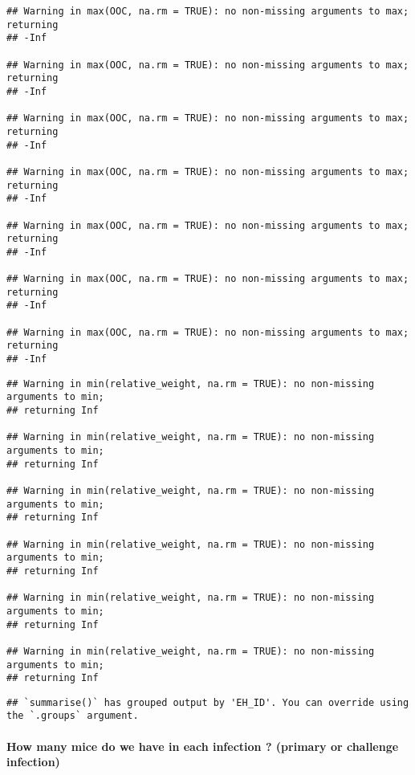 \documentclass[
]{article}
\begin{document}
\begin{verbatim}
## Warning in max(OOC, na.rm = TRUE): no non-missing arguments to max; returning
## -Inf

## Warning in max(OOC, na.rm = TRUE): no non-missing arguments to max; returning
## -Inf

## Warning in max(OOC, na.rm = TRUE): no non-missing arguments to max; returning
## -Inf

## Warning in max(OOC, na.rm = TRUE): no non-missing arguments to max; returning
## -Inf

## Warning in max(OOC, na.rm = TRUE): no non-missing arguments to max; returning
## -Inf

## Warning in max(OOC, na.rm = TRUE): no non-missing arguments to max; returning
## -Inf

## Warning in max(OOC, na.rm = TRUE): no non-missing arguments to max; returning
## -Inf
\end{verbatim}

\begin{verbatim}
## Warning in min(relative_weight, na.rm = TRUE): no non-missing arguments to min;
## returning Inf

## Warning in min(relative_weight, na.rm = TRUE): no non-missing arguments to min;
## returning Inf

## Warning in min(relative_weight, na.rm = TRUE): no non-missing arguments to min;
## returning Inf

## Warning in min(relative_weight, na.rm = TRUE): no non-missing arguments to min;
## returning Inf

## Warning in min(relative_weight, na.rm = TRUE): no non-missing arguments to min;
## returning Inf

## Warning in min(relative_weight, na.rm = TRUE): no non-missing arguments to min;
## returning Inf
\end{verbatim}

\begin{verbatim}
## `summarise()` has grouped output by 'EH_ID'. You can override using the `.groups` argument.
\end{verbatim}

\hypertarget{how-many-mice-do-we-have-in-each-infection-primary-or-challenge-infection}{%
\paragraph{How many mice do we have in each infection ? (primary or
challenge
infection)}\label{how-many-mice-do-we-have-in-each-infection-primary-or-challenge-infection}}
\end{document}
